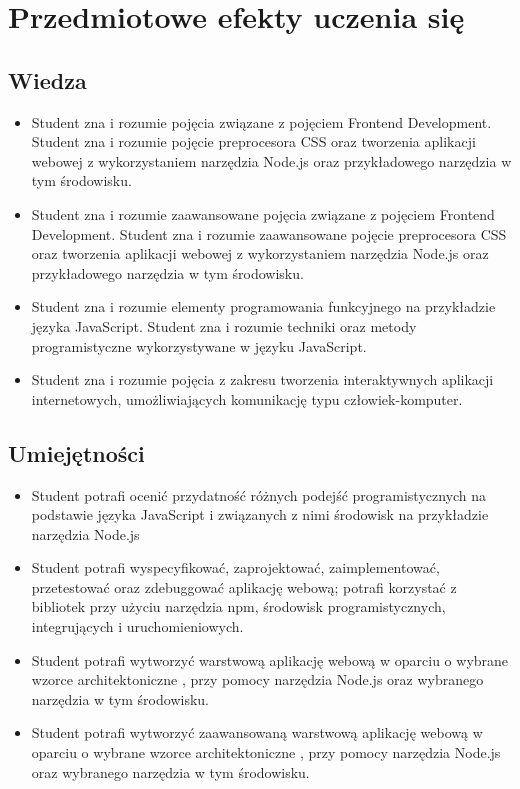 \documentclass[12pt, a4paper]{article}
\begin{document}
\section{Przedmiotowe efekty uczenia się}

\subsection*{Wiedza}
\begin{itemize}
  \item Student zna i rozumie pojęcia związane z pojęciem Frontend Development. Student zna i rozumie pojęcie preprocesora CSS oraz tworzenia aplikacji webowej z wykorzystaniem narzędzia Node.js oraz przykładowego narzędzia w tym środowisku.
  \item Student zna i rozumie zaawansowane  pojęcia związane z pojęciem Frontend Development. Student zna i rozumie zaawansowane pojęcie preprocesora CSS oraz tworzenia aplikacji webowej z wykorzystaniem narzędzia Node.js oraz przykładowego narzędzia w tym środowisku.
  \item Student zna i rozumie elementy programowania funkcyjnego na przykładzie języka JavaScript. Student zna i rozumie techniki oraz metody programistyczne wykorzystywane w języku JavaScript.
  \item Student zna i rozumie pojęcia z zakresu tworzenia interaktywnych aplikacji internetowych, umożliwiających komunikację typu człowiek-komputer.
\end{itemize}

\subsection*{Umiejętności}
\begin{itemize}
  \item Student potrafi ocenić przydatność różnych podejść programistycznych na podstawie języka JavaScript i związanych z nimi środowisk na przykładzie narzędzia Node.js
  \item Student potrafi wyspecyfikować, zaprojektować, zaimplementować, przetestować oraz zdebuggować aplikację webową; potrafi korzystać z bibliotek przy użyciu narzędzia npm, środowisk programistycznych, integrujących i uruchomieniowych.
  \item Student potrafi wytworzyć warstwową aplikację webową w oparciu o wybrane wzorce architektoniczne , przy pomocy narzędzia Node.js oraz wybranego narzędzia w tym środowisku.
  \item Student potrafi wytworzyć zaawansowaną warstwową aplikację webową w oparciu o wybrane wzorce architektoniczne , przy pomocy narzędzia Node.js oraz wybranego narzędzia w tym środowisku.
\end{itemize}
\end{document}
